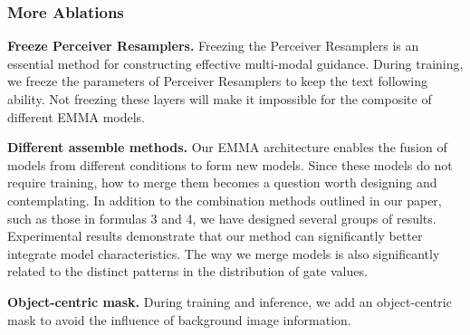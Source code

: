 \subsubsection{More Ablations}

\textbf{Freeze Perceiver Resamplers.} Freezing the Perceiver Resamplers is an essential method for constructing effective multi-modal guidance. During training, we freeze the parameters of Perceiver Resamplers to keep the text following ability. Not freezing these layers will make it impossible for the composite of different EMMA models.

\textbf{Different assemble methods.} 
Our EMMA architecture enables the fusion of models from different conditions to form new models. Since these models do not require training, how to merge them becomes a question worth designing and contemplating. In addition to the combination methods outlined in our paper, such as those in formulas 3 and 4, we have designed several groups of results. Experimental results demonstrate that our method can significantly better integrate model characteristics. The way we merge models is also significantly related to the distinct patterns in the distribution of gate values.

\textbf{Object-centric mask.} During training and inference, we add an object-centric mask to avoid the influence of background image information.



\clearpage

